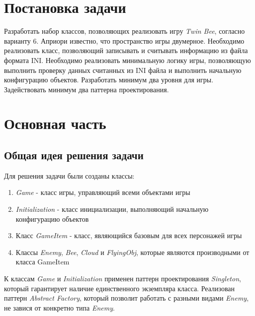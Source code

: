 \documentclass[a4paper,14pt]{article}
\begin{document}

\setcounter{page}{2} %

\renewcommand\contentsname{\centering {\normalsize Содержание}}
\tableofcontents
\newpage

\section*{Постановка задачи}

Разработать набор классов, позволяющих реализовать игру \textit{Twin Bee}, согласно варианту 6. Априори известно, что пространство игры двумерное. Необходимо реализовать класс, позволяющий записывать и считывать информацию из файла формата INI. Необходимо реализовать минимальную логику игры, позволяющую выполнить проверку данных считанных из INI файла и
выполнить начальную конфигурацию объектов. Разработать минимум два уровня для игры.
Задействовать минимум два паттерна проектирования.

\newpage

\section{Основная часть}
\subsection{Общая идея решения задачи}
Для решения задачи были созданы классы:
\begin{enumerate}
	\item \textit{Game} - класс игры, управляющий всеми объектами игры
	\item \textit{Initialization} - класс инициализации, выполняющий начальную конфигурацию объектов
	\item Класс \textit{GameItem} - класс, являющийся базовым для всех персонажей игры
	\item Классы \textit{Enemy}, \textit{Bee}, \textit{Cloud} и \textit{FlyingObj}, которые являются производными от класса GameItem
\end{enumerate}
К классам \textit{Game} и \textit{Initialization} применен паттерн проектирования \textit{Singleton}, который гарантирует наличие единственного экземпляра класса. Реализован паттерн \textit{Abstract Factory}, который позволит работать с разными видами \textit{Enemy}, не завися от конкретно типа \textit{Enemy}.
\end{document}
